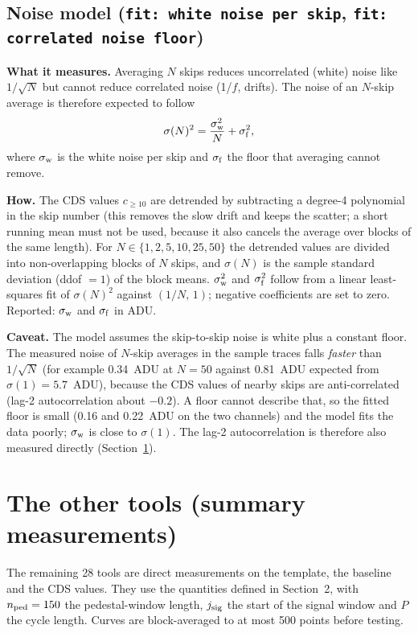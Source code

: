 \documentclass[11pt]{article}
\newcommand{\code}[1]{\texttt{#1}}
\begin{document}
\subsection{Noise model (\code{fit: white noise per skip}, \code{fit: correlated noise floor})}

\textbf{What it measures.} Averaging $N$ skips reduces uncorrelated (white) noise like $1/\sqrt{N}$ but
cannot reduce correlated noise (1/$f$, drifts). The noise of an $N$-skip average is therefore expected to
follow
\begin{equation}
  \sigma(N)^2 = \frac{\sigma_{\rm w}^2}{N} + \sigma_{\rm f}^2 ,
\end{equation}
where $\sigma_{\rm w}$ is the white noise per skip and $\sigma_{\rm f}$ the floor that averaging cannot remove.

\textbf{How.} The CDS values $c_{\ge10}$ are detrended by subtracting a degree-4 polynomial in the skip number (this removes
the slow drift and keeps the scatter; a short running mean must not be used, because it also cancels the average over
blocks of the same length). For $N\in\{1,2,5,10,25,50\}$ the detrended values are divided into
non-overlapping blocks of $N$ skips, and $\sigma(N)$ is the sample standard deviation (ddof $=1$) of the block
means. $\sigma_{\rm w}^2$ and $\sigma_{\rm f}^2$ follow from a linear least-squares fit of $\sigma(N)^2$ against
$(1/N,\,1)$; negative coefficients are set to zero. Reported: $\sigma_{\rm w}$ and $\sigma_{\rm f}$ in ADU.

\textbf{Caveat.} The model assumes the skip-to-skip noise is white plus a constant floor. The measured noise of
$N$-skip averages in the sample traces falls \emph{faster} than $1/\sqrt{N}$ (for example 0.34~ADU at $N=50$ against
0.81~ADU expected from $\sigma(1)=5.7$~ADU), because the CDS values of nearby skips are anti-correlated (lag-2
autocorrelation about $-0.2$). A floor cannot describe that, so the fitted floor is small (0.16 and 0.22~ADU on the two
channels) and the model fits the data poorly; $\sigma_{\rm w}$ is close to $\sigma(1)$. The lag-2 autocorrelation
is therefore also measured directly (Section~\ref{sec:other}).

\section{The other tools (summary measurements)}
\label{sec:other}

The remaining 28 tools are direct measurements on the template, the baseline and the CDS values. They use
the quantities defined in Section~2, with $n_{\rm ped}=150$ the pedestal-window length, $j_{\rm sig}$ the start of the
signal window and $P$ the cycle length. Curves are block-averaged to at most 500 points before testing.
\end{document}
